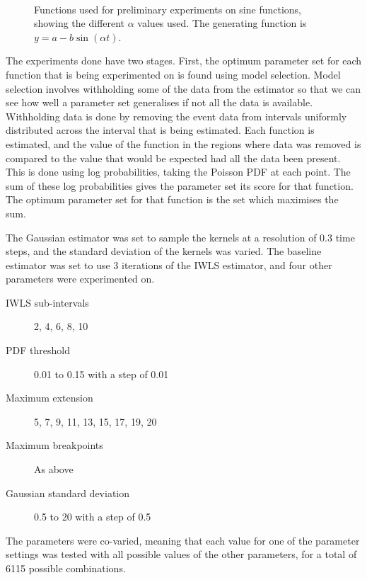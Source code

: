 \documentclass[a4paper,11pt]{article}
\begin{document}
\begin{figure}[h!tb]
{  }\\
  \begin{center}
  \end{center}
  \caption{Functions used for preliminary experiments on sine functions, showing
  the different $\alpha$ values used. The generating function is $y=a-b\sin(\alpha t)$.}
  \label{fig:avals}
  \end{figure}
  The experiments done have two stages. First, the optimum parameter set for each
  function that is being experimented on is found using model selection. Model
  selection involves withholding some of the data from the estimator so that we
  can see how well a parameter set generalises if not all the data is
  available. Withholding data is done by removing the event data from intervals
  uniformly distributed across the interval that is being estimated. Each function
  is estimated, and the value of the function in the regions where data was
  removed is compared to the value that would be expected had all the data been
  present. This is done using log probabilities, taking the Poisson PDF at each
  point. The sum of these log probabilities gives the parameter set its score for
  that function. The optimum parameter set for that function is the set which
  maximises the sum.

  The Gaussian estimator was set to sample the kernels at a resolution of 0.3 time
  steps, and the standard deviation of the kernels was varied. The baseline
  estimator was set to use 3 iterations of the IWLS estimator, and four other
  parameters were experimented on.
  \begin{description}
  \item[IWLS sub-intervals] 2, 4, 6, 8, 10
  \item[PDF threshold] 0.01 to 0.15 with a step of 0.01
  \item[Maximum extension] 5, 7, 9, 11, 13, 15, 17, 19, 20
  \item[Maximum breakpoints] As above
  \item[Gaussian standard deviation] 0.5 to 20 with a step of 0.5
  \end{description}
  The parameters were co-varied, meaning that each value for one
  of the parameter settings was tested with all possible values of the other
  parameters, for a total of 6115 possible combinations.
\end{document}

